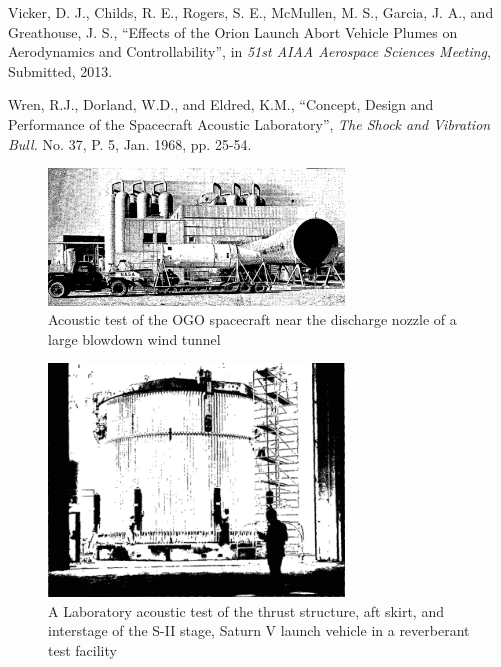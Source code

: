\documentclass[]{aiaa-tc}%
\begin{document}
\begin{thebibliography}{99}
Vicker, D. J., Childs, R. E., Rogers, S. E., McMullen, M. S., Garcia, J. A., and Greathouse, J. S.,  ``Effects of the Orion Launch Abort Vehicle Plumes on Aerodynamics and Controllability'', in {\it 51st AIAA Aerospace Sciences Meeting}, Submitted, 2013.

Wren, R.J., Dorland, W.D., and Eldred, K.M., ``Concept, Design and Performance of the Spacecraft Acoustic Laboratory'', {\it The Shock and Vibration Bull.} No. 37, P. 5, Jan. 1968, pp. 25-54.




\end{thebibliography}




\begin{figure}[htb]
\begin{center}
\includegraphics[width=0.7\textwidth]{Images/Himelblau_Fig36.png}
\caption{Acoustic test of the OGO spacecraft near the discharge nozzle of a large blowdown wind tunnel\cite{SpaceVehicleAeroacousticVibrationPrediction}}
\label{FreeFieldTest}
\end{center}
\end{figure}


\begin{figure}[htb]
\begin{center}
\includegraphics[width=0.7\textwidth]{Images/Himelblau_Fig37.png}
\caption{A Laboratory acoustic test of the thrust structure, aft skirt, and interstage of the S-II stage, Saturn V launch vehicle in a reverberant test facility \cite{SpaceVehicleAeroacousticVibrationPrediction}}
\label{ReverberantTest}
\end{center}
\end{figure}
\end{document}
